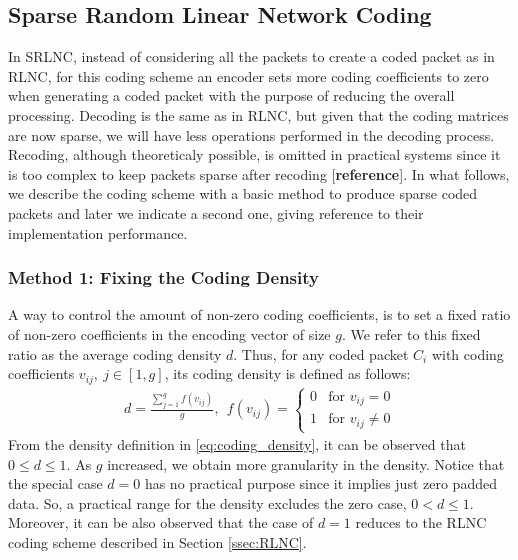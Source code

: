 \subsection{Sparse Random Linear Network Coding}

In \ac{SRLNC}, instead of considering all the packets to create a coded
packet as in \ac{RLNC}, for this coding scheme an encoder sets more
coding coefficients to zero when generating a coded packet with the purpose
of reducing the overall processing. Decoding is the same as in \ac{RLNC}, but
given that the coding matrices are now sparse, we will have less operations
performed in the decoding process. Recoding, although theoreticaly possible,
is omitted in practical systems since it is too complex to keep packets sparse
after recoding [\textbf{reference}]. In what follows, we
describe the coding scheme with a basic method to produce sparse coded
packets and later we indicate a second one, giving reference to their
implementation performance.

\subsubsection{Method 1: Fixing the Coding Density}
A way to control the amount of non-zero coding coefficients, is to set a
fixed ratio of non-zero coefficients in the encoding vector of size $g$. We
refer to this fixed ratio as the average coding density $d$. Thus, for any
coded packet $C_i$ with coding coefficients $v_{ij},\ j \in [1,g]$, its
coding density is defined as follows:
%
\begin{align}
\label{eq:coding_density}
d = \frac{\sum_{j=1}^{g} f(v_{ij})}{g},\ \
    f(v_{ij}) =
    \begin{cases}
        0 & \text{for } v_{ij} = 0 \\
        1 & \text{for } v_{ij} \neq 0
    \end{cases}
\end{align}
%
From the density definition in \eqref{eq:coding_density}, it can be
observed that $0 \leq d \leq 1$. As $g$ increased, we obtain more
granularity in the density. Notice that the special case $d = 0$ has no
practical purpose since it implies just zero padded data. So, a practical
range for the density excludes the zero case, $0 < d \leq 1$. Moreover,
it can be also observed that the case of $d = 1$ reduces to the \ac{RLNC}
coding scheme described in Section \ref{ssec:RLNC}.

